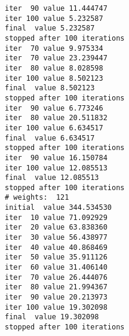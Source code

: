 \documentclass[11pt]{article}
\begin{document}
\begin{verbatim}
iter  90 value 11.444747
iter 100 value 5.232587
final  value 5.232587 
stopped after 100 iterations
iter  70 value 9.975334
iter  70 value 23.239447
iter  80 value 8.028598
iter 100 value 8.502123
final  value 8.502123 
stopped after 100 iterations
iter  90 value 6.773246
iter  80 value 20.511832
iter 100 value 6.634517
final  value 6.634517 
stopped after 100 iterations
iter  90 value 16.150784
iter 100 value 12.085513
final  value 12.085513 
stopped after 100 iterations
# weights:  121
initial  value 344.534530 
iter  10 value 71.092929
iter  20 value 63.838360
iter  30 value 56.438977
iter  40 value 40.868469
iter  50 value 35.911126
iter  60 value 31.406140
iter  70 value 26.444076
iter  80 value 21.994367
iter  90 value 20.213973
iter 100 value 19.302098
final  value 19.302098 
stopped after 100 iterations
\end{verbatim}
\end{document}
